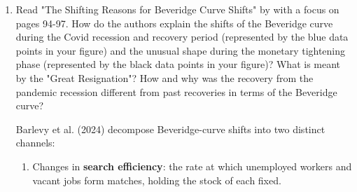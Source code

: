 \documentclass[dvipsnames,11pt]{article}
\begin{document}
\begin{enumerate}
\begin{solution}
                    \paragraph{Monetary tightening and the "soft landing" (black).}

                        The most economically significant recent development is the trajectory of the black data points (May 2022 onward). As the Federal Reserve tightened monetary policy, the economy moved nearly vertically downward on the Beveridge curve: vacancies declined sharply from their historic peaks while the unemployment rate remained largely stable, showing only a slight outward drift at the very end of the series. This near-vertical descent is highly unusual and stands in stark contrast to the standard prediction that reducing labour-market tightness requires a severe trade-off between lower vacancies and higher unemployment. As \textcite{barlevy2024shifting} argue, this "\emph{immaculate disinflation}" is explained by the fact that the elevated vacancies reflected reallocation churn rather than fundamental labour demand: as the Great Resignation subsided, firms withdrew replacement postings without resorting to mass layoffs.
                    
                \end{solution}
        
            \item Read {"The Shifting Reasons for Beveridge Curve Shifts"} by \textcite{barlevy2024shifting} with a focus on pages 94-97. How do the authors explain the shifts of the Beveridge curve during the Covid recession and recovery period (represented by the blue data points in your figure) and the unusual shape during the monetary tightening phase (represented by the black data points in your figure)? What is meant by the "Great Resignation"? How and why was the recovery from the pandemic recession different from past recoveries in terms of the Beveridge curve?

                \begin{solution}

                    Barlevy et al. (2024) decompose Beveridge-curve shifts into two distinct channels:
                    \begin{enumerate}
                        \item Changes in \textbf{search efficiency}: the rate at which unemployed workers and vacant jobs form matches, holding the stock of each fixed.
                        

\end{enumerate}
\end{solution}
\end{enumerate}
\end{document}
